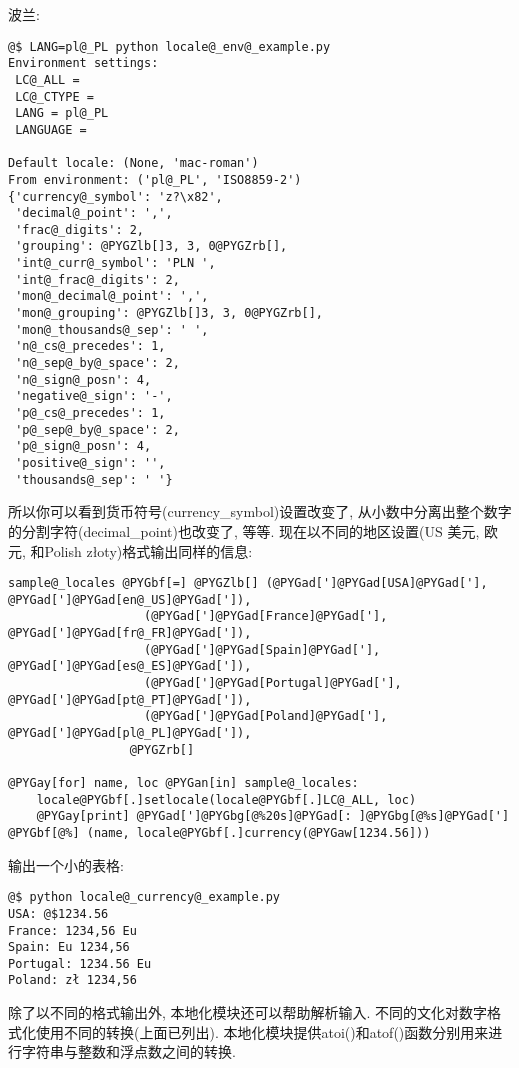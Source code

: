 \documentclass[letterpaper,10pt,english]{manual}
\begin{document}
波兰:

\begin{Verbatim}[commandchars=@\[\]]
@$ LANG=pl@_PL python locale@_env@_example.py
Environment settings:
 LC@_ALL =
 LC@_CTYPE =
 LANG = pl@_PL
 LANGUAGE =

Default locale: (None, 'mac-roman')
From environment: ('pl@_PL', 'ISO8859-2')
{'currency@_symbol': 'z?\x82',
 'decimal@_point': ',',
 'frac@_digits': 2,
 'grouping': @PYGZlb[]3, 3, 0@PYGZrb[],
 'int@_curr@_symbol': 'PLN ',
 'int@_frac@_digits': 2,
 'mon@_decimal@_point': ',',
 'mon@_grouping': @PYGZlb[]3, 3, 0@PYGZrb[],
 'mon@_thousands@_sep': ' ',
 'n@_cs@_precedes': 1,
 'n@_sep@_by@_space': 2,
 'n@_sign@_posn': 4,
 'negative@_sign': '-',
 'p@_cs@_precedes': 1,
 'p@_sep@_by@_space': 2,
 'p@_sign@_posn': 4,
 'positive@_sign': '',
 'thousands@_sep': ' '}
\end{Verbatim}

所以你可以看到货币符号(currency\_symbol)设置改变了, 从小数中分离出整个数字的分割字符(decimal\_point)也改变了, 等等. 现在以不同的地区设置(US 美元, 欧元, 和Polish złoty)格式输出同样的信息:

\begin{Verbatim}[commandchars=@\[\]]
sample@_locales @PYGbf[=] @PYGZlb[] (@PYGad[']@PYGad[USA]@PYGad['], @PYGad[']@PYGad[en@_US]@PYGad[']),
                   (@PYGad[']@PYGad[France]@PYGad['], @PYGad[']@PYGad[fr@_FR]@PYGad[']),
                   (@PYGad[']@PYGad[Spain]@PYGad['], @PYGad[']@PYGad[es@_ES]@PYGad[']),
                   (@PYGad[']@PYGad[Portugal]@PYGad['], @PYGad[']@PYGad[pt@_PT]@PYGad[']),
                   (@PYGad[']@PYGad[Poland]@PYGad['], @PYGad[']@PYGad[pl@_PL]@PYGad[']),
                 @PYGZrb[]

@PYGay[for] name, loc @PYGan[in] sample@_locales:
    locale@PYGbf[.]setlocale(locale@PYGbf[.]LC@_ALL, loc)
    @PYGay[print] @PYGad[']@PYGbg[@%20s]@PYGad[: ]@PYGbg[@%s]@PYGad['] @PYGbf[@%] (name, locale@PYGbf[.]currency(@PYGaw[1234.56]))
\end{Verbatim}

输出一个小的表格:

\begin{Verbatim}[commandchars=@\[\]]
@$ python locale@_currency@_example.py
USA: @$1234.56
France: 1234,56 Eu
Spain: Eu 1234,56
Portugal: 1234.56 Eu
Poland: zł 1234,56
\end{Verbatim}

除了以不同的格式输出外, 本地化模块还可以帮助解析输入. 不同的文化对数字格式化使用不同的转换(上面已列出). 本地化模块提供atoi()和atof()函数分别用来进行字符串与整数和浮点数之间的转换.
\end{document}

